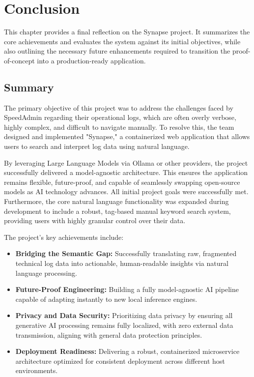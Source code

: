 \section{Conclusion} \label{sec:conclusion}
This chapter provides a final reflection on the Synapse project. It summarizes the core achievements and evaluates the system against its initial objectives, while also outlining the necessary future enhancements required to transition the proof-of-concept into a production-ready application.

\subsection{Summary}
The primary objective of this project was to address the challenges faced by SpeedAdmin regarding their operational logs, which are often overly verbose, highly complex, and difficult to navigate manually. To resolve this, the team designed and implemented "Synapse," a containerized web application that allows users to search and interpret log data using natural language.

By leveraging Large Language Models via Ollama or other providers, the project successfully delivered a model-agnostic architecture. This ensures the application remains flexible, future-proof, and capable of seamlessly swapping open-source models as AI technology advances. All initial project goals were successfully met. Furthermore, the core natural language functionality was expanded during development to include a robust, tag-based manual keyword search system, providing users with highly granular control over their data.

The project's key achievements include:
\begin{itemize}
    \item \textbf{Bridging the Semantic Gap:} Successfully translating raw, fragmented technical log data into actionable, human-readable insights via natural language processing.
    \item \textbf{Future-Proof Engineering:} Building a fully model-agnostic AI pipeline capable of adapting instantly to new local inference engines.
    \item \textbf{Privacy and Data Security:} Prioritizing data privacy by ensuring all generative AI processing remains fully localized, with zero external data transmission, aligning with general data protection principles.
    \item \textbf{Deployment Readiness:} Delivering a robust, containerized microservice architecture optimized for consistent deployment across different host environments.
\end{itemize}

